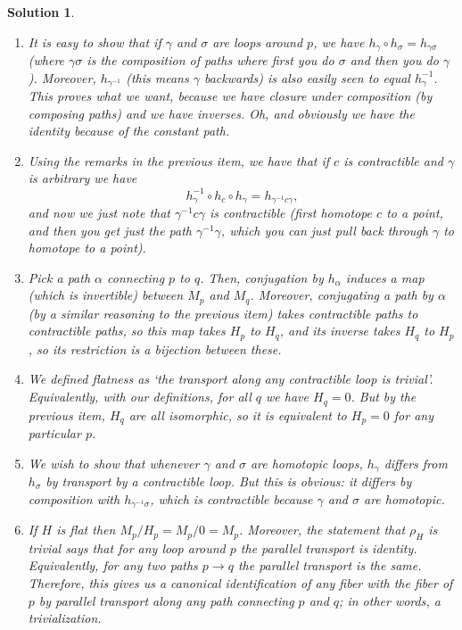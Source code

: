 \documentclass{article}
\theoremstyle{plain}
\theoremstyle{nonumberplain}
\newtheorem{sol}{Solution}
\begin{document}
\begin{sol}
\leavevmode
\begin{enumerate}
\item It is easy to show that if $\gamma$ and $\sigma$ are loops around $p$, we have $h_\gamma \circ h_\sigma = h_{\gamma \sigma}$ (where $\gamma \sigma$ is the composition of paths where first you do $\sigma$ and then you do $\gamma$). Moreover, $h_{\gamma^{-1}}$ (this means $\gamma$ backwards) is also easily seen to equal $h_\gamma^{-1}$. This proves what we want, because we have closure under composition (by composing paths) and we have inverses. Oh, and obviously we have the identity because of the constant path.

\item Using the remarks in the previous item, we have that if $c$ is contractible and $\gamma$ is arbitrary we have
\begin{equation}
h_\gamma^{-1} \circ h_c \circ h_\gamma = h_{\gamma^{-1} c \gamma},
\end{equation}
and now we just note that $\gamma^{-1} c \gamma$ is contractible (first homotope $c$ to a point, and then you get just the path $\gamma^{-1} \gamma$, which you can just pull back through $\gamma$ to homotope to a point).

\item Pick a path $\alpha$ connecting $p$ to $q$. Then, conjugation by $h_\alpha$ induces a map (which is invertible) between $M_p$ and $M_q$. Moreover, conjugating a path by $\alpha$ (by a similar reasoning to the previous item) takes contractible paths to contractible paths, so this map takes $H_p$ to $H_q$, and its inverse takes $H_q$ to $H_p$, so its restriction is a bijection between these.

\item We defined flatness as `the transport along any contractible loop is trivial'. Equivalently, with our definitions, for all $q$ we have $H_q = 0$. But by the previous item, $H_q$ are all isomorphic, so it is equivalent to $H_p = 0$ for any particular $p$.

\item We wish to show that whenever $\gamma$ and $\sigma$ are homotopic loops, $h_\gamma$ differs from $h_\sigma$ by transport by a contractible loop. But this is obvious: it differs by composition with $h_{\gamma^{-1} \sigma}$, which is contractible because $\gamma$ and $\sigma$ are homotopic.

\item If $H$ is flat then $M_p/H_p = M_p/0 = M_p$. Moreover, the statement that $\rho_H$ is trivial says that for any loop around $p$ the parallel transport is identity. Equivalently, for any two paths $p \to q$ the parallel transport is the same. Therefore, this gives us a canonical identification of any fiber with the fiber of $p$ by parallel transport along any path connecting $p$ and $q$; in other words, a trivialization.



\end{enumerate}
\end{sol}
\end{document}
